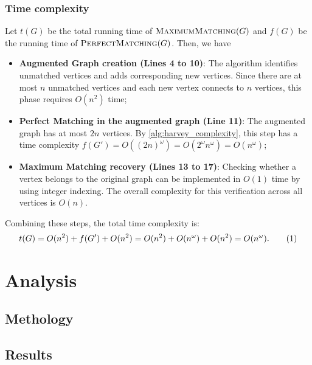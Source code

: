 \subsubsection{Time complexity}
\noindent
Let \(t(G)\) be the total running time of \(\textsc{MaximumMatching}(G)\) and \(f(G)\) be the running time of \(\textsc{PerfectMatching}(G)\). Then, we have
\begin{itemize}
\item \textbf{Augmented Graph creation (Lines 4 to 10)}:
The algorithm identifies unmatched vertices and adds corresponding new vertices. 
Since there are at most \(n\) unmatched vertices and each new vertex connects to \(n\) vertices, this phase requires \(O(n^2)\) time;

\item \textbf{Perfect Matching in the augmented graph (Line 11)}: 
The augmented graph has at most \(2n\) vertices. 
By \cref{alg:harvey_complexity}, this step has a time complexity  \(f(G') = O((2n)^\omega) = O(2^\omega n^\omega) = O(n^\omega)\);

\item \textbf{Maximum Matching recovery (Lines 13 to 17)}: 
Checking whether a vertex belongs to the original graph can be implemented in \(O(1)\) time by using integer indexing. 
The overall complexity for this verification across all vertices is \(O(n)\).
\end{itemize}
Combining these steps, the total time complexity is:
\[
t(G) = O(n^2) + f(G') + O(n^2) = O(n^2) + O(n^\omega) + O(n^2) = O(n^\omega). \numberthis \label{alg:maximum_matching_complexity}
\]

\section{Analysis}
\label{Maximum:analysis}

\subsection{Methology}

\subsection{Results}

